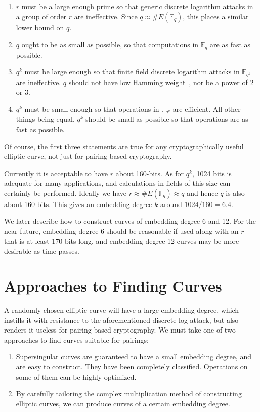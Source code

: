 \begin{enumerate}
\item
$r$ must be a large enough prime so that generic discrete logarithm attacks
in a group of order $r$ are ineffective. Since $q \approx \#E(\mathbb{F}_q)$,
this places a similar lower bound on $q$.
\item
$q$ ought to be as small as possible, so that computations in $\mathbb{F}_q$
are as fast as possible.
\item
$q^k$ must be large enough so that finite field discrete logarithm attacks
in $\mathbb{F}_{q^k}$ are ineffective.
$q$ should not have low Hamming weight~\cite{someone}, nor be a power of
$2$ or $3$.
\item
$q^k$ must be small enough so that operations in $\mathbb{F}_{q^k}$
are efficient. All other things being equal,
$q^k$ should be small as possible so that operations
are as fast as possible.
\end{enumerate}

Of course, the first three statements are true for any cryptographically
useful elliptic curve, not just for pairing-based cryptography.

Currently it is acceptable to have $r$ about 160-bits.
As for $q^k$, 1024 bits is adequate for many applications, and calculations
in fields of this size can certainly be performed.
Ideally we have $r \approx \#E(\mathbb{F}_q) \approx q$
and hence $q$ is also about 160 bits. This gives an
embedding degree $k$ around $1024 / 160 = 6.4$.

We later describe how to construct curves of embedding degree 6 and 12.
For the near future, embedding degree 6 should be reasonable if used along
with an $r$ that is at least $170$ bits long,
and embedding degree 12 curves may be more desirable as time passes.

\section {Approaches to Finding Curves}

A randomly-chosen elliptic curve will have a large embedding
degree, which instills it with resistance to the aforementioned discrete log
attack, but also renders it useless for pairing-based cryptography.
We must take one of two approaches to find curves suitable for pairings:

\begin{enumerate}
\item
Supersingular curves are guaranteed to have a small embedding degree,
and are easy to construct. They have been completely classified. Operations
on some of them can be highly optimized.
\item
By carefully tailoring the complex multiplication method of constructing
elliptic curves, we can produce curves of a certain embedding degree. 
\end{enumerate}

